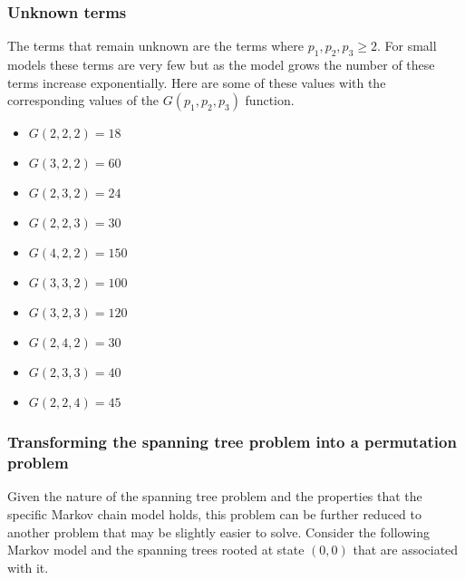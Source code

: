\subsubsection{Unknown terms}

The terms that remain unknown are the terms where \(p_1, p_2, p_3 \geq 2\). 
For small models these terms are very few but as the model grows the number of these terms increase exponentially. 
Here are some of these values with the corresponding values of the \(G(p_1,p_2,p_3)\) function.

\begin{multicols}{2}
    \begin{itemize}
        \item \(G(2,2,2) = 18\) 
        \item \(G(3,2,2) = 60\)
        \item \(G(2,3,2) = 24\)
        \item \(G(2,2,3) = 30\)
        \item \(G(4,2,2) = 150\)
        \item \(G(3,3,2) = 100\)
        \item \(G(3,2,3) = 120\)
        \item \(G(2,4,2) = 30\)
        \item \(G(2,3,3) = 40\)
        \item \(G(2,2,4) = 45\)
    \end{itemize}
\end{multicols}

\subsubsection{Transforming the spanning tree problem into a permutation problem}

Given the nature of the spanning tree problem and the properties that the specific Markov chain model holds, this problem can be further reduced to another problem that may be slightly easier to solve. 
Consider the following Markov model and the spanning trees rooted at state \((0,0)\) that are associated with it. 

\begin{figure}[h]
    \centering
    \scalebox{0.7}{} \vspace{0.8cm} \\
    \scalebox{0.6}{} \hspace{0.7cm}
    \scalebox{0.6}{} \vspace{0.4cm} \\
    \scalebox{0.6}{} \hspace{0.7cm}
    \scalebox{0.6}{}\vspace{0.4cm} \\
    \scalebox{0.6}{}
\end{figure}

